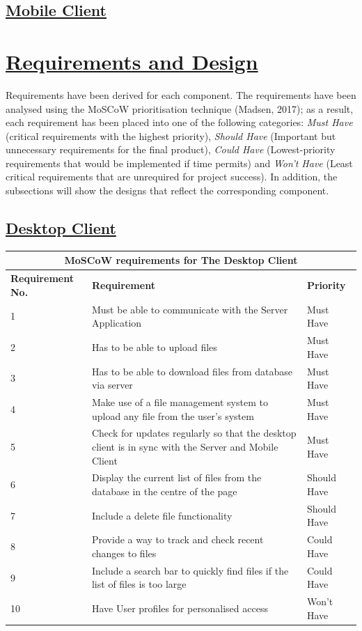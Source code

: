 \documentclass{article}
\begin{document}
\subsection{\underline{Mobile Client}}


\section{\underline{Requirements and Design}}
Requirements have been derived for each component. The requirements have been analysed using the MoSCoW prioritisation technique (Madsen, 2017); as a result, each requirement has been placed into one of the following categories: \textit{Must Have} (critical requirements with the highest priority), \textit{Should Have} (Important but unnecessary requirements for the final product), \textit{Could Have} (Lowest-priority requirements that would be implemented if time permits) and \textit{Won't Have} (Least critical requirements that are unrequired for project success). In addition, the subsections will show the designs that reflect the corresponding component.

\subsection{\underline{Desktop Client}}
\begin{tabular}{|p{3cm}|p{5cm}|p{4cm}|}
\hline
\multicolumn{3}{|c|}{\textbf{MoSCoW requirements for The Desktop Client}} \\
\hline
\textbf{Requirement No.} & \textbf{Requirement} & \textbf{Priority}\\
\hline
1 & Must be able to communicate with the Server Application & Must Have \\
\hline
2 & Has to be able to upload files & Must Have \\
\hline
3 & Has to be able to download files from database via server & Must Have \\
\hline
4 & Make use of a file management system to upload any file from the user's system & Must Have \\
\hline
5 & Check for updates regularly so that the desktop client is in sync with the Server and Mobile Client & Must Have\\
\hline
6 & Display the current list of files from the database in the centre of the page & Should Have \\
\hline
7 & Include a delete file functionality   & Should Have \\
\hline
8 & Provide a way to track and check recent changes to files & Could Have\\
\hline
9 & Include a search bar to quickly find files if the list of files is too large & Could Have \\
\hline
10 & Have User profiles for personalised access & Won't Have \\
\hline
\end{tabular}
\end{document}
